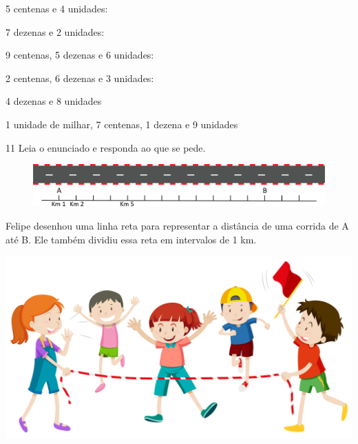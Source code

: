 \begin{escolha}
\item 5 centenas e 4 unidades:

\item 7 dezenas e 2 unidades:

\item 9 centenas, 5 dezenas e 6 unidades:

\item 2 centenas, 6 dezenas e 3 unidades:

\item 4 dezenas e 8 unidades

\item 1 unidade de milhar, 7 centenas, 1 dezena e 9 unidades

\end{escolha}


\num{11} Leia o enunciado e responda ao que se pede. 

\vspace{1em}

\begin{figure}[htpb!]
\centering
\includegraphics[width=\textwidth]{./media/image6.png}
\end{figure}

\vspace{1em}

Felipe desenhou uma linha reta para representar a distância de uma corrida de A até B. Ele também dividiu essa reta em intervalos de 1 km. 

\includegraphics[width=\textwidth]{./media/image6a.jpeg}

